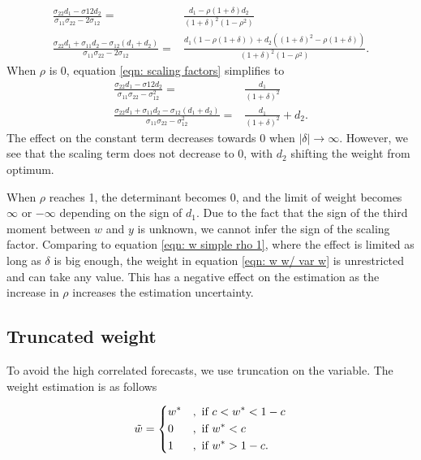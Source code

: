 \documentclass[11pt]{article}
\begin{document}
\begin{equation}
\label{eqn: scaling factors}
\begin{aligned}
\frac{\sigma_{22} d_1 - \sigma{12}d_2}{\sigma_{11}\sigma_{22} - 2\sigma_{12}} =& \frac{d_1-\rho(1+\delta) d_2}{(1+\delta)^2 (1- \rho^2)}\\
\frac{\sigma_{22} d_1 + \sigma_{11} d_2 -\sigma_{12} (d_1 + d_2)}{\sigma_{11}\sigma_{22} - 2\sigma_{12}} =& \frac{d_1(1- \rho(1+\delta)) + d_2 ((1+\delta)^2-\rho(1+\delta))} {(1+\delta)^2 (1- \rho^2)}.
\end{aligned}
\end{equation}
When $\rho$ is 0, equation \ref{eqn: scaling factors} simplifies to 
\begin{equation}
\label{eqn: scaling factor rho 0}
\begin{aligned}
\frac{\sigma_{22} d_1 - \sigma{12}d_2}{\sigma_{11}\sigma_{22} - \sigma_{12}^2} =& \frac{d_1}{(1+\delta)^2}\\
\frac{\sigma_{22} d_1 + \sigma_{11} d_2 -\sigma_{12} (d_1 + d_2)}{\sigma_{11}\sigma_{22} - \sigma_{12}^2} =& \frac{d_1} {(1+\delta)^2} + d_2.
\end{aligned}
\end{equation}
The effect on the constant term decreases towards 0 when $|\delta| \to \infty$. However, we see that the scaling term does not decrease to 0, with $d_2$ shifting the weight from optimum.


When $\rho$ reaches 1, the determinant becomes 0, and the limit of weight becomes $\infty$ or $-\infty$ depending on the sign of $d_1$. Due to the fact that the sign of the third moment between $w$ and $y$ is unknown, we cannot infer the sign of the scaling factor. Comparing to equation \ref{eqn: w simple rho 1}, where the effect is limited as long as $\delta$ is big enough, the weight in equation \ref{eqn: w w/ var w} is unrestricted and can take any value. This has a negative effect on the estimation as the increase in $\rho$ increases the estimation uncertainty.

\subsection{Truncated weight}\label{truncated-weight}

To avoid the high correlated forecasts, we use truncation on the
variable. The weight estimation is as follows

\begin{equation}
\label{eqn: w trunc}
\tilde{w} = 
\begin{dcases}
w^* &, \text{ if } c<w^*<1-c \\
0 &, \text{ if } w^*<c \\
1 &, \text{ if } w^*>1-c.
\end{dcases}
\end{equation}
\end{document}
